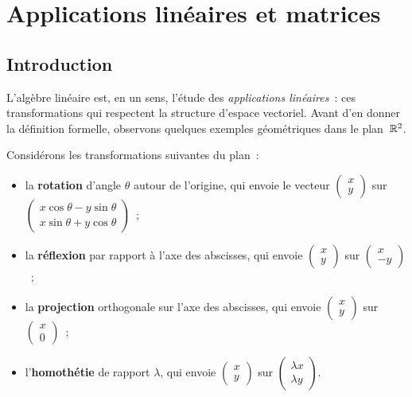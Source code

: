 
\chapter{Applications linéaires et matrices}\label{ch:applications-lineaires}

\section*{Introduction}

L'algèbre linéaire est, en un sens, l'étude des \emph{applications
linéaires}~: ces transformations qui respectent
la structure d'espace vectoriel. Avant d'en donner la définition formelle,
observons quelques exemples géométriques dans le plan~${\mathbb{R}}^2$.

\medskip

Considérons les transformations suivantes du plan~:
\begin{itemize}
  \item la \textbf{rotation} d'angle $\theta$ autour de
    l'origine, qui envoie le vecteur $\begin{pmatrix}x\\y\end{pmatrix}$
    sur $\begin{pmatrix}x\cos\theta-y\sin\theta\\x\sin\theta+y\cos\theta\end{pmatrix}$~;
  \item la \textbf{réflexion} par rapport à l'axe des
    abscisses, qui envoie $\begin{pmatrix}x\\y\end{pmatrix}$ sur
    $\begin{pmatrix}x\\-y\end{pmatrix}$~;
  \item la \textbf{projection} orthogonale sur l'axe des
    abscisses, qui envoie $\begin{pmatrix}x\\y\end{pmatrix}$ sur
    $\begin{pmatrix}x\\0\end{pmatrix}$~;
  \item l'\textbf{homothétie} de rapport $\lambda$, qui
    envoie $\begin{pmatrix}x\\y\end{pmatrix}$ sur
    $\begin{pmatrix}\lambda x\\\lambda y\end{pmatrix}$.
\end{itemize}

